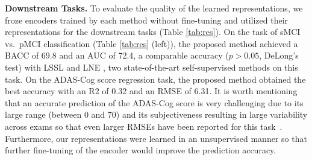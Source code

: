 \documentclass[runningheads]{llncs}
\begin{document}

\noindent\textbf{Downstream Tasks.}
To evaluate the quality of the learned representations, we froze encoders trained by each method without fine-tuning and utilized their representations for the downstream tasks (Table \ref{tab:res}). On the task of sMCI vs.~pMCI classification (Table \ref{tab:res} (left)), the proposed method achieved a BACC of 69.8 and an AUC of 72.4, a comparable accuracy ($p > 0.05$, DeLong's test) with LSSL \cite{zhao2020lssl} and LNE \cite{ouyang2021self}, two state-of-the-art self-supervised methods on this task. On the ADAS-Cog score regression task, the proposed method obtained the best accuracy with an R2 of 0.32 and an RMSE of 6.31. It is worth mentioning that an accurate prediction of the ADAS-Cog score is very challenging due to its large range (between 0 and 70) and its subjectiveness resulting in large variability across exams \cite{connor2008administration} so that even larger RMSEs have been reported for this task~\cite{ma2021multi}. Furthermore, our representations were learned in an unsupervised manner so that further fine-tuning of the encoder would improve the prediction accuracy.
\end{document}

